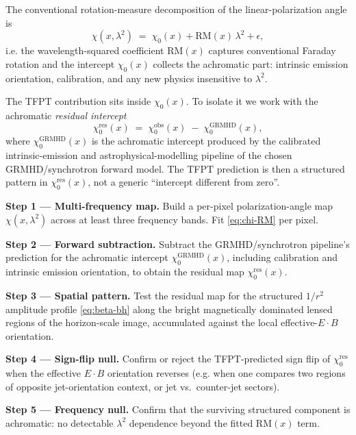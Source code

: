 \documentclass[11pt,a4paper]{article}
\begin{document}
The conventional rotation-measure decomposition of the linear-polarization angle is
\begin{equation}
\label{eq:chi-RM}
\chi(x,\lambda^2) \;=\; \chi_0(x) + \mathrm{RM}(x)\,\lambda^2 + \epsilon,
\end{equation}
i.e. the wavelength-squared coefficient $\mathrm{RM}(x)$ captures conventional Faraday rotation
and the intercept $\chi_0(x)$ collects the achromatic part: intrinsic emission orientation,
calibration, and any new physics insensitive to $\lambda^2$.

The TFPT contribution sits inside $\chi_0(x)$. To isolate it we work with the achromatic
\emph{residual intercept}
\begin{equation}
\label{eq:chi-res}
\chi_0^{\mathrm{res}}(x)
\;=\;
\chi_0^{\mathrm{obs}}(x)\;-\;\chi_0^{\mathrm{GRMHD}}(x),
\end{equation}
where $\chi_0^{\mathrm{GRMHD}}(x)$ is the achromatic intercept produced by the calibrated
intrinsic-emission and astrophysical-modelling pipeline of the chosen GRMHD/synchrotron forward
model. The TFPT prediction is then a structured pattern in $\chi_0^{\mathrm{res}}(x)$, not a
generic ``intercept different from zero''.

\begin{tcolorbox}[colback=tfptblue!2, colframe=tfptblue!50, breakable,
    title={Achromatic residual-intercept test}, colbacktitle=tfptblue!70]
\textbf{Step 1 — Multi-frequency map.} Build a per-pixel polarization-angle map
$\chi(x,\lambda^2)$ across at least three frequency bands. Fit \eqref{eq:chi-RM} per pixel.

\textbf{Step 2 — Forward subtraction.} Subtract the GRMHD/synchrotron pipeline's prediction for
the achromatic intercept $\chi_0^{\mathrm{GRMHD}}(x)$, including calibration and intrinsic
emission orientation, to obtain the residual map $\chi_0^{\mathrm{res}}(x)$.

\textbf{Step 3 — Spatial pattern.} Test the residual map for the structured $1/r^2$ amplitude
profile \eqref{eq:beta-bh} along the bright magnetically dominated lensed regions of the
horizon-scale image, accumulated against the local effective-$E\!\cdot\!B$ orientation.

\textbf{Step 4 — Sign-flip null.} Confirm or reject the TFPT-predicted sign flip of
$\chi_0^{\mathrm{res}}$ when the effective $E\!\cdot\!B$ orientation reverses (e.g. when one
compares two regions of opposite jet-orientation context, or jet vs.\ counter-jet sectors).

\textbf{Step 5 — Frequency null.} Confirm that the surviving structured component is achromatic:
no detectable $\lambda^2$ dependence beyond the fitted $\mathrm{RM}(x)$ term.
\end{tcolorbox}
\end{document}
